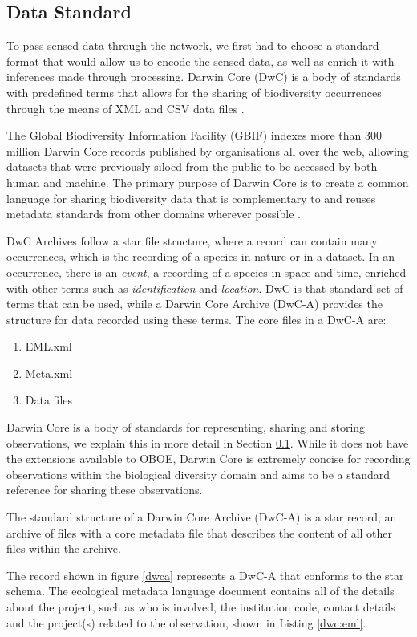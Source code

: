 	\subsection{Data Standard}\label{arch:tech:dwc}
		To pass sensed data through the network, we first had to choose a standard format that would allow us to encode the sensed data, as well as enrich it with inferences made through processing. Darwin Core (DwC) is a body of standards with predefined terms that allows for the sharing of biodiversity occurrences through the means of XML and CSV data files \cite{Wieczorek2012b}.

The Global Biodiversity Information Facility (GBIF) indexes more than 300 million Darwin Core records published by organisations all over the web, allowing datasets that were previously siloed from the public to be accessed by both human and machine. The primary purpose of Darwin Core is to create a common language for sharing biodiversity data that is complementary to and reuses metadata standards from other domains wherever possible \cite{Wieczorek2012a}.

DwC Archives follow a star file structure, where a record can contain many occurrences, which is the recording of a species in nature or in a dataset. In an occurrence, there is an \textit{event}, a recording of a species in space and time, enriched with other terms such as \textit{identification} and \textit{location}. DwC is that standard set of terms that can be used, while a Darwin Core Archive (DwC-A) provides the structure for data recorded using these terms. The core files in a DwC-A are:
\begin{enumerate}
	\item EML.xml
	\item Meta.xml
	\item Data files
\end{enumerate}
Darwin Core is a body of standards for representing, sharing and storing observations, we explain this in more detail in Section \ref{arch:tech:dwc}. While it does not have the extensions available to OBOE, Darwin Core is extremely concise for recording observations within the biological diversity domain and aims to be a standard reference for sharing these observations.

The standard structure of a Darwin Core Archive (DwC-A) is a star record; an archive of files with a core metadata file that describes the content of all other files within the archive.

The record shown in figure \ref{dwca} represents a DwC-A that conforms to the star schema. The ecological metadata language document contains all of the details about the project, such as who is involved, the institution code, contact details and the project(s) related to the observation, shown in Listing \ref{dwc:eml}.

